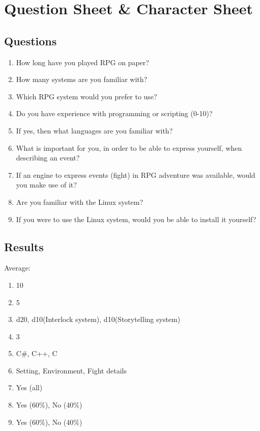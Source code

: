 \chapter{Question Sheet \& Character Sheet}
\label{qsheets}

\section*{Questions}

\begin{enumerate}
\item How long have you played RPG on paper?
\item How many systems are you familiar with?
\item Which RPG system would you prefer to use?
\item Do you have experience with programming or scripting (0-10)?
\item If yes, then what languages are you familiar with?
\item What is important for you, in order to be able to express yourself, when describing an event?
\item If an engine to express events (fight) in RPG adventure was available, would you make use of it?
\item Are you familiar with the Linux system?
\item If you were to use the Linux system, would you be able to install it yourself?
\end{enumerate}

\pagebreak

\section*{Results}

Average:
\begin{enumerate}
\item 10
\item 5
\item d20, d10(Interlock system), d10(Storytelling system)
\item 3
\item C\#, C++, C
\item Setting, Environment, Fight details
\item Yes (all)
\item Yes (60\%), No (40\%)
\item Yes (60\%), No (40\%)
\end{enumerate}

\pagebreak